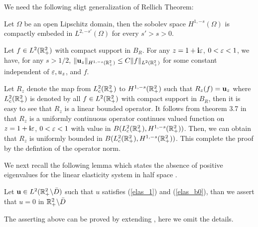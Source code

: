 \documentclass[12pt]{iopart}
\begin{document}
We need the following sligt generalization of Rellich Theorem:
\begin{lem}\label{relli_embed}
	Let $\Omega$ be an open Lipschitz domain, then the sobolev space $H^{1,-s}(\Omega)$ is compactly embeded in $L^{2,-s'}(\Omega)$ for every $s'>s>0$.
\end{lem}

\begin{lem}{\label{global_es}}
	Let  $ f  \in L^2 (\mathbb{R}^2_+) $ with compact support in $B_R$. For any $z=1+\mathbf{i}\varepsilon$, $0<\varepsilon<1$, we have, for any $s>1/2$,
	$\|\mathbf{u}_z\|_{H^{1,-s}(\mathbb{R}^2_+)}\le C\|f\|_{L^2(\mathbb{R}^2_+)}$ for some constant independent of $\varepsilon, u_z$, and $f$.
\end{lem}
\debproof
Let $R_z$ denote the map from $L^2_c(\mathbb{R}^2_+)$ to $H^{1,-s}(\mathbb{R}^2_+)$ such that $R_z(f)=\mathbf{u}_z$ where $L^2_c(\mathbb{R}^2_+)$ is denoted by all $ f  \in L^2 (\mathbb{R}^2_+) $ with compact support in $B_R$, then it is easy to see that $R_z$ is a linear bounded operator. It follows from theorem 3.7 in \cite{Yves1988} that $R_z$ is a uniformly continuous operator continues valued function on $z=1+\mathbf{i}\varepsilon$, $0<\varepsilon<1$ with value in $B(L^2_c(\mathbb{R}^2_+),H^{1,-s}(\mathbb{R}^2_+))$. Then, we can obtain that $R_z$ is uniformly bounded in $B(L^2_c(\mathbb{R}^2_+),H^{1,-s}(\mathbb{R}^2_+))$. This complete the proof by the defintion of the operator norm.
\finproof

We next recall the following lemma which states the absence of positive eigenvalues for the linear elasticity system in half space \cite{sini2004}.
\begin{lem} \label{elas_unique}
	Let $\mathbf{u}\in L^2(\mathbb{R}^2_+ \backslash \bar D)$ such that $u$ satisfies (\ref{elas_1}) and (\ref{elas_b0}), than we assert that $u=0$ in $\mathbb{R}^2_+ \backslash \bar D$
\end{lem}
\debproof
The asserting above can be proved by extending \cite[theorem 3.1]{sini2004}, here we omit the details.
\finproof
\end{document}
